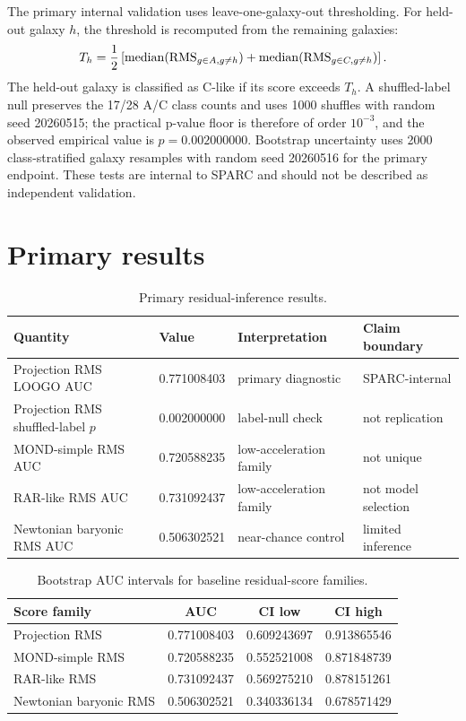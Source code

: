 \documentclass[11pt]{article}
\begin{document}
The primary internal validation uses leave-one-galaxy-out thresholding. For held-out galaxy $h$, the threshold is recomputed from the remaining galaxies:
\[
T_h={1\over2}\left[{\rm median}({\rm RMS}_{g\in A,g\ne h})+
{\rm median}({\rm RMS}_{g\in C,g\ne h})\right].
\]
The held-out galaxy is classified as C-like if its score exceeds $T_h$. A shuffled-label null preserves the 17/28 A/C class counts and uses 1000 shuffles with random seed 20260515; the practical p-value floor is therefore of order $10^{-3}$, and the observed empirical value is $p=0.002000000$. Bootstrap uncertainty uses 2000 class-stratified galaxy resamples with random seed 20260516 for the primary endpoint. These tests are internal to SPARC and should not be described as independent validation.

\section{Primary results}

\begin{table}[H]
\centering
\caption{Primary residual-inference results.}
\begin{tabular}{llll}
\toprule
Quantity & Value & Interpretation & Claim boundary\\
\midrule
Projection RMS LOOGO AUC & 0.771008403 & primary diagnostic & SPARC-internal\\
Projection RMS shuffled-label $p$ & 0.002000000 & label-null check & not replication\\
MOND-simple RMS AUC & 0.720588235 & low-acceleration family & not unique\\
RAR-like RMS AUC & 0.731092437 & low-acceleration family & not model selection\\
Newtonian baryonic RMS AUC & 0.506302521 & near-chance control & limited inference\\
\bottomrule
\end{tabular}
\end{table}

\begin{table}[H]
\centering
\caption{Bootstrap AUC intervals for baseline residual-score families.}
\begin{tabular}{lccc}
\toprule
Score family & AUC & CI low & CI high\\
\midrule
Projection RMS & 0.771008403 & 0.609243697 & 0.913865546\\
MOND-simple RMS & 0.720588235 & 0.552521008 & 0.871848739\\
RAR-like RMS & 0.731092437 & 0.569275210 & 0.878151261\\
Newtonian baryonic RMS & 0.506302521 & 0.340336134 & 0.678571429\\
\bottomrule
\end{tabular}
\end{table}
\end{document}

